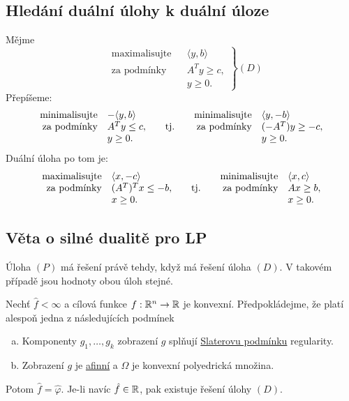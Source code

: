 \subsection{Hledání duální úlohy k duální úloze}
Mějme
\[
\left.\begin{aligned}
    &\text{maximalisujte}&& \langle y,b \rangle \\
    &\text{za podmínky}  && A^Ty \geq c, \\
    &                    && y \geq 0.
\end{aligned}
\right\} (D)
\]
Přepíšeme:
\[
\begin{array}{r@{\quad}l@{\qquad}c@{\qquad}r@{\quad}l}
\text{minimalisujte}& -\langle y, b \rangle&           &\text{minimalisujte}& \langle y, -b \rangle \\
\text{za podmínky}  & A^T y \leq c,        & \text{tj.}&\text{za podmínky}  & (-A^T) y \geq -c, \\
                    & y \geq 0.            &           &                    & y \geq 0.
\end{array}
\]
Duální úloha po tom je:
\[
    \begin{array}{r@{\quad}l@{\qquad}c@{\qquad}r@{\quad}l}
        \text{maximalisujte}& \langle x,-c \rangle&           & \text{minimalisujte}& \langle x,c \rangle \\
        \text{za podmínky}  &(A^T)^Tx \leq -b,    & \text{tj.}&\text{za podmínky}   & Ax \geq b, \\
                            & x \geq 0.           &           &                     & x \geq 0.
    \end{array}
\]

\subsection{Věta o silné dualitě pro LP}
Úloha $(P)$ má řešení právě tehdy, když má řešení úloha $(D)$. V takovém případě jsou hodnoty obou úloh stejné.

Nechť $\hat f < \infty$ a cílová funkce $f : \mathbb{R}^n \rightarrow \mathbb{R}$ je konvexní. Předpokládejme, že platí alespoň jedna z 
následujících podmínek
\begin{enumerate}[(a)]
    \item Komponenty $g_1, \dots, g_k$ zobrazení $g$ splňují \hyperref[slaterPodm]{Slaterovu podmínku} regularity.
    \item Zobrazení $g$ je \hyperref[sec:afin]{afinní} a $\Omega$ je konvexní polyedrická množina.  
\end{enumerate}
Potom $\hat f = \hat \varphi$. Je-li navíc $\hat f \in \mathbb{R}$, pak existuje řešení úlohy $(D)$.


